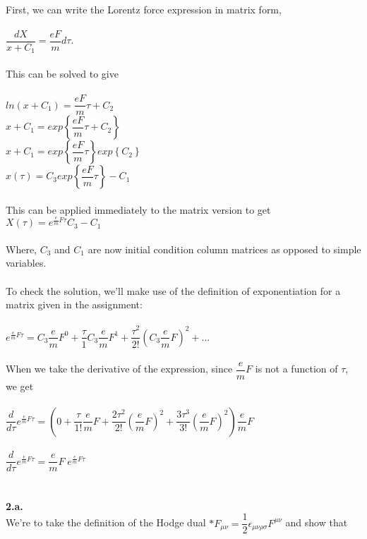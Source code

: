 \documentclass[prb,preprint]
{revtex4-1}
\newcommand{\PRLsep}{\noindent\makebox[\linewidth]{\resizebox{0.8888\linewidth}{2pt}{$\bullet$}}\bigskip}
\begin{document}
\\
First, we can write the Lorentz force expression in matrix form,
\\
\\
$\dfrac{dX}{x+C_1} = \dfrac{e F}{m} d\tau$.
\\
\\
This can be solved to give
\\
\\
$ln\left(x+C_1\right) = \dfrac{e F}{m} \tau + C_2$
\\
$x + C_1 = exp\left\{\dfrac{e F}{m} \tau + C_2\right\}$
\\
$x + C_1 = exp\left\{\dfrac{e F}{m} \tau\right\}exp\left\{C_2\right\}$
\\
$x\left(\tau\right) = C_3 exp\left\{\dfrac{e F}{m} \tau\right\} - C_1$
\\
\\
This can be applied immediately to the matrix version to get 
\\
$X\left(\tau\right) = e^{\frac{e}{m}F\tau}C_3  - C_1$
\\
\\
Where, $C_3$ and $C_1$ are now initial condition column matrices as opposed to simple variables.  
\\
\\
To check the solution, we'll make use of the definition of exponentiation for a matrix given in the assignment:
\\
\\
$e^{\frac{e}{m}F\tau} = C_3\dfrac{e}{m}F^0 + \dfrac{\tau}{1}C_3\dfrac{e}{m}F^1 + \dfrac{\tau^2}{2!}\left(C_3\dfrac{e}{m}F\right)^2 + ...$
\\
\\
When we take the derivative of the expression, since $\dfrac{e}{m}F$ is not a function of $\tau$, we get
\\
\\
$\dfrac{d}{d\tau} e^{\frac{e}{m}F\tau} = \left(0 + \dfrac{\tau}{1!}\dfrac{e}{m}F + \dfrac{2\tau^2}{2!}\left(\dfrac{e}{m}F\right)^2 + \dfrac{3\tau^3}{3!}\left(\dfrac{e}{m}F\right)^2\right)\dfrac{e}{m}F$
\\
\\
$\dfrac{d}{d\tau} e^{\frac{e}{m}F\tau} = \dfrac{e}{m}F\;e^{\frac{e}{m}F\tau}$ 
\\
\\
\PRLsep
\\
\newpage
\textbf{2.a.}
\\
We're to take the definition of the Hodge dual
$*F_{\mu\nu} = \dfrac{1}{2}\epsilon_{\mu\nu\rho\sigma}F^{\mu\nu}$ and show that
\end{document}

